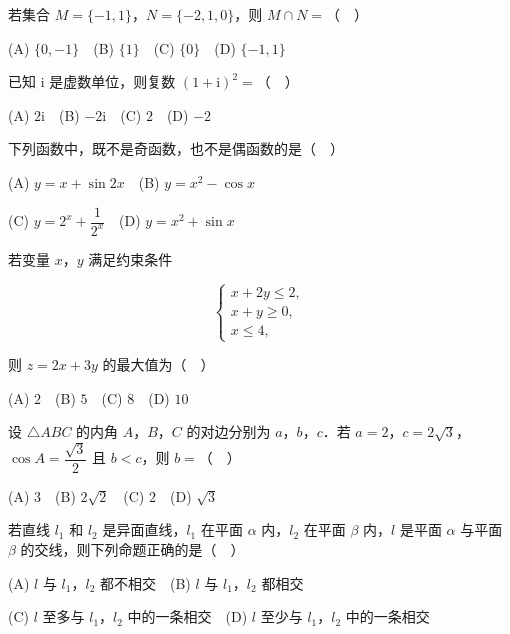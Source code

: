 \begin{question}
若集合 \(M=\{-1,1\}\)，\(N=\{-2,1,0\}\)，则 \(M\cap N=\)（　）

(A) \(\{0,-1\}\)　(B) \(\{1\}\)　(C) \(\{0\}\)　(D) \(\{-1,1\}\)

\end{question}
\begin{question}
已知 \(\mathrm{i}\) 是虚数单位，则复数 \((1+\mathrm{i})^2=\)（　）

(A) \(2\mathrm{i}\)　(B) \(-2\mathrm{i}\)　(C) \(2\)　(D) \(-2\)

\end{question}
\begin{question}
下列函数中，既不是奇函数，也不是偶函数的是（　）

(A) \(y=x+\sin 2x\)　(B) \(y=x^2-\cos x\)

(C) \(y=2^x+\dfrac{1}{2^x}\)　(D) \(y=x^2+\sin x\)

\end{question}
\begin{question}
若变量 \(x\)，\(y\) 满足约束条件

\nopagebreak[4]
\[
\begin{cases}
x+2y\leqslant 2,\\
x+y\geqslant 0,\\
x\leqslant 4,
\end{cases}
\]

则 \(z=2x+3y\) 的最大值为（　）

(A) \(2\)　(B) \(5\)　(C) \(8\)　(D) \(10\)

\end{question}
\begin{question}
设 \(\triangle ABC\) 的内角 \(A\)，\(B\)，\(C\) 的对边分别为 \(a\)，\(b\)，\(c\)．若 \(a=2\)，\(c=2\sqrt{3}\)，\(\cos A=\dfrac{\sqrt{3}}{2}\) 且 \(b<c\)，则 \(b=\)（　）

(A) \(3\)　(B) \(2\sqrt{2}\)　(C) \(2\)　(D) \(\sqrt{3}\)

\end{question}
\begin{question}
若直线 \(l_1\) 和 \(l_2\) 是异面直线，\(l_1\) 在平面 \(\alpha\) 内，\(l_2\) 在平面 \(\beta\) 内，\(l\) 是平面 \(\alpha\) 与平面 \(\beta\) 的交线，则下列命题正确的是（　）

(A) \(l\) 与 \(l_1\)，\(l_2\) 都不相交　(B) \(l\) 与 \(l_1\)，\(l_2\) 都相交

(C) \(l\) 至多与 \(l_1\)，\(l_2\) 中的一条相交　(D) \(l\) 至少与 \(l_1\)，\(l_2\) 中的一条相交

\end{question}
